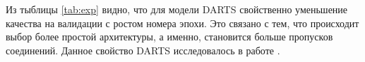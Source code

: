 \documentclass[12pt, twoside]{article}
\begin{document}
Из тыблицы \ref{tab:exp} видно, что для модели DARTS свойственно уменьшение качества на валидации с ростом номера эпохи. Это связано с тем, что происходит выбор более простой архитектуры, а именно, становится больше пропусков соединений. Данное свойство DARTS исследовалось в работе \cite{journals/corr/abs-1911-12126}.


\newpage

\end{document}
